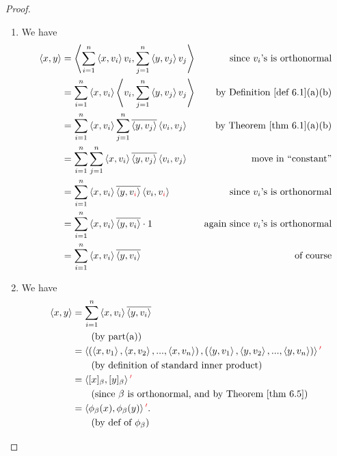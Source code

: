 \begin{proof} \ 

\begin{enumerate}
\item We have
\begin{align*}
    \LG x, y \RG & = \LG \sum_{i = 1}^n \LG x, v_i \RG v_i, \sum_{j = 1}^n \LG y, v_j \RG v_j \RG & \text{since \(v_i\)'s is orthonormal} \\
    & = \sum_{i = 1}^n \LG x, v_i \RG \LG v_i, \sum_{j = 1}^n \LG y, v_j \RG v_j \RG & \text{by \DEF{6.1}(a)(b)} \\
    & = \sum_{i = 1}^n \LG x, v_i \RG \sum_{j = 1}^n \conjugatet{\LG y, v_j \RG} \LG v_i, v_j \RG & \text{by \THM{6.1}(a)(b)} \\
    & = \sum_{i = 1}^n \sum_{j = 1}^n \LG x, v_i \RG  \conjugatet{\LG y, v_j \RG} \LG v_i, v_j \RG & \text{move in ``constant''} \\
    & = \sum_{i = 1}^n \LG x, v_i \RG  \conjugatet{\LG y, v_{\RED{i}} \RG} \LG v_i, v_{\RED{i}} \RG & \text{since \(v_i\)'s is orthonormal} \\
    & = \sum_{i = 1}^n \LG x, v_i \RG \conjugatet{\LG y, v_i \RG} \cdot 1 & \text{again since \(v_i\)'s is orthonormal} \\
    & = \sum_{i = 1}^n \LG x, v_i \RG \conjugatet{\LG y, v_i \RG} & \text{of course}
\end{align*}

\item We have
\begin{align*}
    \LG x, y \RG & = \sum_{i = 1}^n \LG x, v_i \RG \conjugatet{\LG y, v_i \RG} \\
    & \quad \quad \text{(by part(a))} \\
    & = \LG \left( \LG x, v_1 \RG, \LG x, v_2 \RG, ..., \LG x, v_n \RG \right), \left(\LG y, v_1 \RG, \LG y, v_2 \RG, ..., \LG y, v_n \RG\right) \RG\RED{'} \\
    & \quad \quad \text{(by definition of standard inner product)} \\
    & = \LG [x]_{\beta}, [y]_{\beta} \RG\RED{'} \\
    & \quad \quad \text{(since \(\beta\) is orthonormal, and by \THM{6.5})} \\
    & = \LG \phi_{\beta}(x), \phi_{\beta}(y) \RG\RED{'}. \\
    & \quad \quad \text{(by def of \(\phi_{\beta}\))}
\end{align*}
\end{enumerate}
\end{proof}

